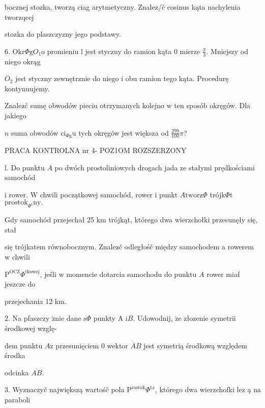 \documentclass[a4paper,12pt]{article}
\begin{document}
bocznej stozka, tworzą ciag arytmetyczny. Znalez/č cosinus kąta nachylenia tworzqcej

stozka do plaszczyzny jego podstawy.

6. $\mathrm{O}\mathrm{k}\mathrm{r}\Phi \mathrm{g}O_{1}\mathrm{o}$ promieniu l jest styczny do ramion kąta $0$ mierze $\displaystyle \frac{\pi}{3}$. Mniejszy od niego okrąg

$O_{2}$ jest styczny zewnętrznie do niego $\mathrm{i}$ obu ramion tego kąta. Procedurę kontynuujemy.

Znalez$\acute{}$č sumę obwodów pieciu otrzymanych kolejno $\mathrm{w}$ ten sposób okręgów. Dla jakiego

$n$ suma obwodów $\mathrm{c}\mathrm{i}_{\Phi \mathrm{g}}\mathrm{u}$ tych okręgów jest większa od $\displaystyle \frac{299}{100}\pi$?




PRACA KONTROLNA nr 4- POZ1OM ROZSZERZONY

l. Do punktu $A$ po dwóch prostoliniowych drogach jada ze stałymi prędkościami samochód

$\mathrm{i}$ rower. $\mathrm{W}$ chwili początkowej samochód, rower $\mathrm{i}$ punkt $ A\mathrm{t}\mathrm{w}\mathrm{o}\mathrm{r}\mathrm{z}\Phi$ trójk$\Phi$t $\mathrm{p}\mathrm{r}\mathrm{o}\mathrm{s}\mathrm{t}\mathrm{o}\mathrm{k}_{\Phi^{\mathrm{t}}}\mathrm{n}\mathrm{y}.$

Gdy samochód przejechał 25 km trójkąt, którego dwa wierzchołki przesunęły się, stał

się trójkatem równobocznym. Znalez$\acute{}$č odległośč między samochodem a rowerem $\mathrm{w}$ chwili

$\mathrm{P}^{\mathrm{O}\mathrm{C}\mathrm{Z}}\Phi^{\mathrm{t}\mathrm{k}\mathrm{o}\mathrm{w}\mathrm{e}\mathrm{j}}$, jeśli $\mathrm{w}$ momencie dotarcia samochodu do punktu $A$ rower miaf jeszcze do

przejechania 12 km.

2. Na pfaszczy $\acute{\mathrm{z}}\mathrm{n}\mathrm{i}\mathrm{e}$ dane $\mathrm{s}\Phi$ punkty A $\mathrm{i}B$. Udowodnij, $\dot{\mathrm{z}}\mathrm{e}$ złozenie symetrii środkowej wzglę-

dem punktu $A\mathrm{z}$ przesunięciem $0$ wektor $\overline{A}B$ jest symetrią środkową względem środka

odcinka $\overline{AB}.$

3. Wyznaczyč największą wartośč pola $\mathrm{P}^{\mathrm{r}\mathrm{o}\mathrm{s}\mathrm{t}\mathrm{o}\mathrm{k}}\Phi^{\mathrm{t}\mathrm{a}}$, którego dwa wierzchofki $\mathrm{l}\mathrm{e}\dot{\mathrm{z}}$ ą na paraboli
\end{document}
